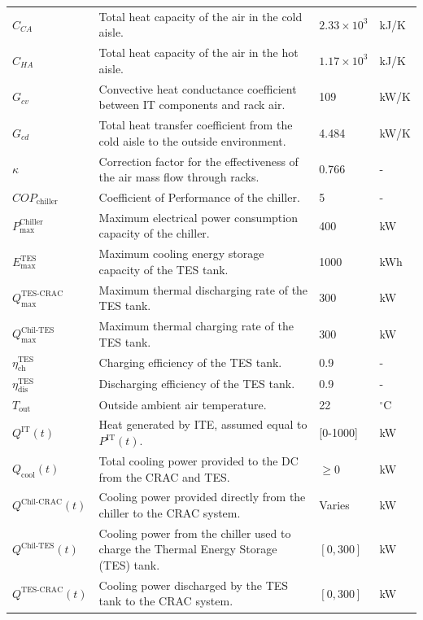 \documentclass[lettersize,journal]{IEEEtran}
\begin{document}
{{\begin{longtable}{p{} p{} p{} p{}}
$C_{CA}$ & Total heat capacity of the air in the cold aisle. & $2.33 \times 10^3$ & kJ/K \\
$C_{HA}$ & Total heat capacity of the air in the hot aisle. & $1.17 \times 10^3$ & kJ/K \\
$G_{cv}$ & Convective heat conductance coefficient between IT components and rack air. & 109 &kW/K \\
$G_{cd}$ & Total heat transfer coefficient from the cold aisle to the outside environment. & 4.484 &kW/K \\
$\kappa$ & Correction factor for the effectiveness of the air mass flow through racks. & 0.766 & - \\
$COP_{\mathrm{chiller}}$ & Coefficient of Performance of the chiller. & 5 & - \\
$P^{\mathrm{Chiller}}_{\mathrm{max}}$ & Maximum electrical power consumption capacity of the chiller. & 400 &kW \\
$E^{\mathrm{TES}}_{\mathrm{max}}$ & Maximum cooling energy storage capacity of the TES tank. & 1000 &kWh \\
$Q^{\mathrm{TES}\text{-}\mathrm{CRAC}}_{\mathrm{max}}$ & Maximum thermal discharging rate of the TES tank. & 300 &kW \\
$Q^{\mathrm{Chil}\text{-}\mathrm{TES}}_{\mathrm{max}}$ & Maximum thermal charging rate of the TES tank. & 300 &kW \\
$\eta^{\mathrm{TES}}_{\mathrm{ch}}$ & Charging efficiency of the TES tank. & 0.9 & - \\
$\eta^{\mathrm{TES}}_{\mathrm{dis}}$ & Discharging efficiency of the TES tank. & 0.9 & - \\
$T_{\mathrm{out}}$ & Outside ambient air temperature. & 22 & $^{\circ}$C \\
$Q^{\mathrm{IT}}(t)$ & Heat generated by ITE, assumed equal to $P^{\mathrm{IT}}(t)$. & [0-1000] &kW \\
$Q_{\mathrm{cool}}(t)$ & Total cooling power provided to the DC from the CRAC and TES. & $\geq 0$ &kW \\
$Q^{\mathrm{Chil}\text{-}\mathrm{CRAC}}(t)$ & Cooling power provided directly from the chiller to the CRAC system. & Varies &kW \\
$Q^{\mathrm{Chil}\text{-}\mathrm{TES}}(t)$ & Cooling power from the chiller used to charge the Thermal Energy Storage (TES) tank. & $[0, 300]$ &kW \\
$Q^{\mathrm{TES}\text{-}\mathrm{CRAC}}(t)$ & Cooling power discharged by the TES tank to the CRAC system. & $[0, 300]$ &kW \\

\end{longtable}}}
\end{document}
